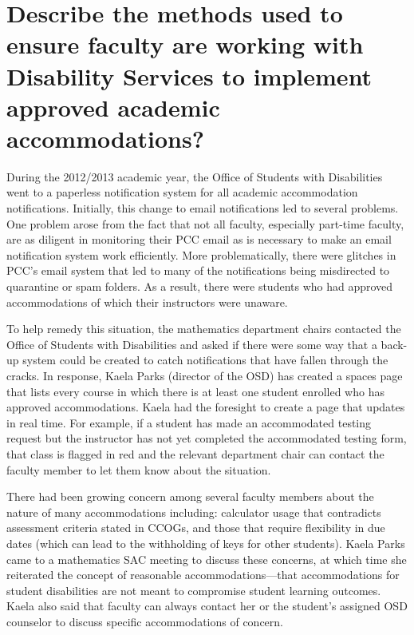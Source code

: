 \section[Approved academic accommodations]{Describe the methods used to ensure faculty are working with Disability Services to implement approved academic accommodations?}
During the 2012/2013 academic year, the Office of Students with Disabilities
went to a paperless notification system for all academic accommodation
notifications.  Initially, this change to email notifications led to several
problems.  One problem arose from the fact that not all faculty, especially
part-time faculty, are as diligent in monitoring their PCC email as is
necessary to make an email notification system work efficiently.  More
problematically, there were glitches in PCC's email system that led to many of the
notifications being misdirected to quarantine or spam folders.  As a result,
there were students who had approved accommodations of which their instructors
were unaware.

To help remedy this situation, the mathematics department chairs contacted the
Office of Students with Disabilities and asked if there were some way that a
back-up system could be created to catch notifications that have fallen through
the cracks.  In response, Kaela Parks (director of the OSD) has created a
spaces page that lists every course in which there is at least one student
enrolled who has approved accommodations.  Kaela had the foresight to create a
page that updates in real time.  For example, if a student has made an
accommodated testing request but the instructor has not yet completed the
accommodated testing form, that class is flagged in red and the relevant
department chair can contact the faculty member to let them know about the
situation.

There had been growing concern among several faculty members
about the nature of many accommodations including:  calculator usage that
contradicts assessment criteria stated in CCOGs, and  those that require flexibility
in due dates (which can lead to the withholding of keys for other students).  Kaela Parks came to a mathematics SAC
meeting to discuss these concerns, at which time she reiterated the concept of
reasonable accommodations---that accommodations for student disabilities are not
meant to compromise student learning outcomes.
Kaela also said that
faculty can always contact her or the student's assigned OSD counselor to
discuss specific accommodations of concern.

